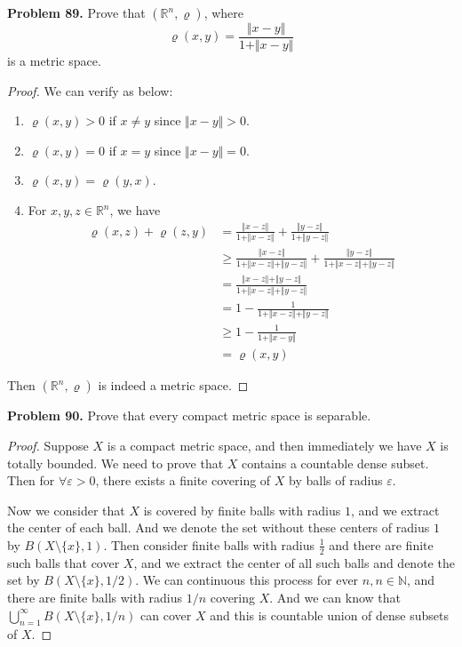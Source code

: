 \documentclass[12pt,leqno]{amsart}
\theoremstyle{definition}
\numberwithin{equation}{subsection}
\begin{document}
\noindent
{\bf Problem 89.}
Prove that $(\mathbb{R}^n,\varrho)$, where
$$
\varrho(x,y) =\frac{\Vert x-y\Vert}{1+\Vert x-y\Vert}
$$
is a metric space.
\begin{proof}
We can verify as below:
~\begin{enumerate}
    \item $\varrho(x,y) > 0$ if $x \neq y$ since $\Vert x-y\Vert > 0$.
    \item $\varrho(x,y) = 0$ if $x = y$ since $\Vert x-y\Vert = 0$.
    \item $\varrho(x,y) = \varrho(y,x)$.
    \item For $x,y,z\in\mathbb{R}^n$, we have
    \begin{align*}
        \varrho(x,z) + \varrho(z,y) & = \frac{\Vert x-z\Vert}{1 + \Vert x-z\Vert} + \frac{\Vert y-z\Vert}{1 + \Vert y-z\Vert} \\
        & \geq \frac{\Vert x-z\Vert}{1 + \Vert x-z\Vert + \Vert y-z\Vert} + \frac{\Vert y-z\Vert}{1 + \Vert x-z\Vert + \Vert y-z\Vert} \\
        & = \frac{\Vert x-z\Vert + \Vert y-z\Vert}{1 + \Vert x-z\Vert + \Vert y-z\Vert} \\
        & = 1 - \frac{1}{1 + \Vert x-z\Vert + \Vert y-z\Vert} \\
        & \geq 1 - \frac{1}{1 + \Vert x-y\Vert} \\
        & = \varrho(x,y)
    \end{align*}
\end{enumerate}
Then $(\mathbb{R}^n,\varrho)$ is indeed a metric space.
\end{proof}

\medskip

\noindent
{\bf Problem 90.}
Prove that every compact metric space is separable.
\begin{proof}
Suppose $X$ is a compact metric space, and then immediately we have $X$ is totally bounded. We need to prove that $X$ contains a countable dense subset. Then for $\forall\varepsilon > 0$, there exists a finite covering of $X$ by balls of radius $\varepsilon$. 

Now we consider that $X$ is covered by finite balls with radius $1$, and we extract the center of each ball. And we denote the set without these centers of radius $1$ by $B(X\setminus\{x\},1)$. Then consider finite balls with radius $\frac{1}{2}$ and there are finite such balls that cover $X$, and we extract the center of all such balls and denote the set by $B(X\setminus\{x\},1/2)$. We can continuous this process for ever $n, n\in\mathbb{N}$, and there are finite balls with radius $1/n$ covering $X$. And we can know that $\bigcup^\infty_{n=1}B(X\setminus\{x\},1/n)$ can cover $X$ and this is countable union of dense subsets of $X$. 
\end{proof}
\end{document}
